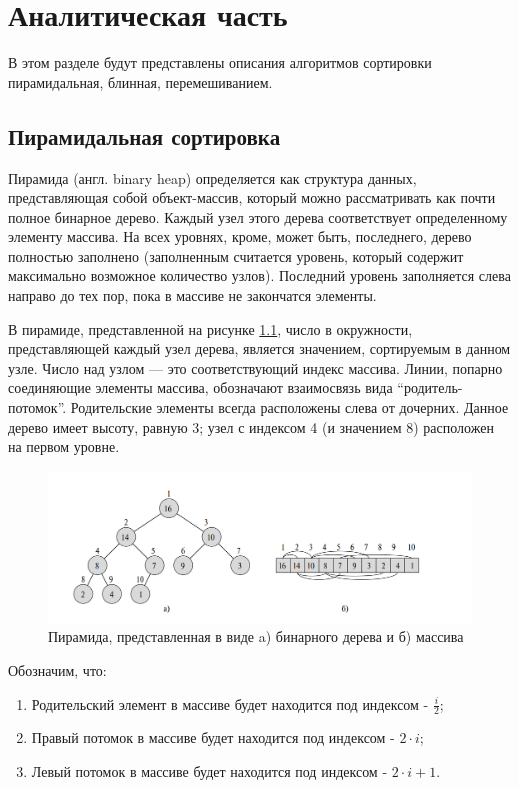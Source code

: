 \chapter{Аналитическая часть}

В этом разделе будут представлены описания алгоритмов сортировки пирамидальная,
блинная, перемешиванием.

\section{Пирамидальная сортировка}

Пирамида (англ. binary heap) определяется как структура данных, представляющая собой объект-массив, который можно рассматривать как почти полное бинарное дерево. Каждый узел этого дерева соответствует определенному элементу массива. На всех уровнях, кроме, может быть, последнего, дерево полностью заполнено (заполненным считается уровень, который содержит максимально возможное количество узлов). Последний уровень заполняется слева направо до тех пор, пока в массиве не закончатся элементы. 

В пирамиде, представленной на рисунке \ref{fig:heap_structs}, число в окружности, представляющей каждый узел дерева, является значением, сортируемым в данном узле. Число над узлом — это соответствующий индекс массива. Линии, попарно соединяющие элементы массива, обозначают взаимосвязь вида “родитель-потомок”. Родительские элементы всегда расположены слева от дочерних. Данное дерево имеет высоту, равную 3; узел с индексом 4 (и значением 8) расположен на первом уровне.

\begin{figure}[h]
	\centering
	\includegraphics[height=0.25\textheight]{img/heap_structs.jpg}
	\caption{Пирамида, представленная в виде a) бинарного дерева и б) массива}
	\label{fig:heap_structs}
\end{figure}

Обозначим, что:
\begin{enumerate} 
	\item Родительский элемент в массиве будет находится под индексом - $\frac{i}{2}$;
	\item Правый потомок в массиве будет находится под индексом - $2 \cdot i$;
	\item Левый потомок в массиве будет находится под индексом - $2 \cdot i + 1$.
\end{enumerate}

